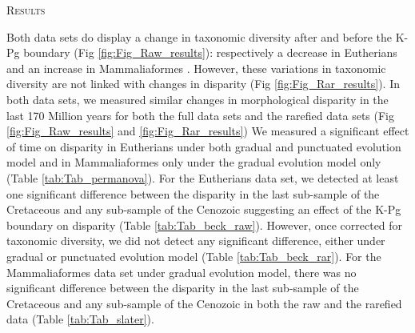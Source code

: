 \documentclass[12pt,letterpaper]{article}
\renewcommand{\section}[1]{%
\bigskip
\begin{center}
\begin{Large}
\normalfont\scshape #1
\medskip
\end{Large}
\end{center}}
\begin{document}

%
%

\section{Results}
Both data sets do display a change in taxonomic diversity after and before the K-Pg boundary (Fig \ref{fig:Fig_Raw_results}): respectively a decrease in Eutherians \citep[data from][]{beckancient2014} and an increase in Mammaliaformes \citep[data from][]{Slater2012MEE}.
However, these variations in taxonomic diversity are not linked with changes in disparity (Fig \ref{fig:Fig_Rar_results}).
In both data sets, we measured similar changes in morphological disparity in the last 170 Million years for both the full data sets and the rarefied data sets (Fig \ref{fig:Fig_Raw_results} and \ref{fig:Fig_Rar_results})
We measured a significant effect of time on disparity in Eutherians under both gradual and punctuated evolution model and in Mammaliaformes only under the gradual evolution model only (Table \ref{tab:Tab_permanova}).
For the Eutherians data set, we detected at least one significant difference between the disparity in the last sub-sample of the Cretaceous and any sub-sample of the Cenozoic suggesting an effect of the K-Pg boundary on disparity (Table \ref{tab:Tab_beck_raw}).
However, once corrected for taxonomic diversity, we did not detect any significant difference, either under gradual or punctuated evolution model (Table \ref{tab:Tab_beck_rar}).
For the Mammaliaformes data set under gradual evolution model, there was no significant difference between the disparity in the last sub-sample of the Cretaceous and any sub-sample of the Cenozoic in both the raw and the rarefied data (Table \ref{tab:Tab_slater}).
\end{document}
